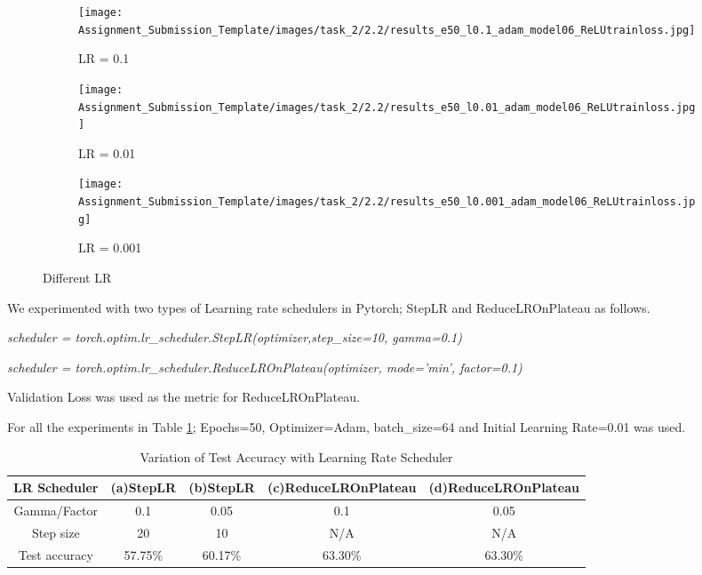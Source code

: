 \documentclass{article} %
\begin{document}
\begin{figure}[h!]
	\centering
	\begin{subfigure}{0.32\linewidth}
		\texttt{[image: Assignment\_Submission\_Template/images/task\_2/2.2/results\_e50\_l0.1\_adam\_model06\_ReLUtrainloss.jpg]}
		\caption{LR = 0.1}
		\label{fig:LR0.1}
	\end{subfigure}	
        \begin{subfigure}{0.32\linewidth}
		\texttt{[image: Assignment\_Submission\_Template/images/task\_2/2.2/results\_e50\_l0.01\_adam\_model06\_ReLUtrainloss.jpg]}
		\caption{LR = 0.01}
		\label{fig:LR0.01}
	\end{subfigure}	
	\begin{subfigure}{0.32\linewidth}
	        \texttt{[image: Assignment\_Submission\_Template/images/task\_2/2.2/results\_e50\_l0.001\_adam\_model06\_ReLUtrainloss.jpg]}
	        \caption{LR = 0.001}
	        \label{fig:LR0.001}
         \end{subfigure}
	\caption{Different LR}
	\label{fig:subfigures}
\end{figure}



We experimented with two types of Learning rate schedulers in Pytorch; StepLR and ReduceLROnPlateau as follows.

\textit{scheduler = torch.optim.lr\_scheduler.StepLR(optimizer,step\_size=10, gamma=0.1)} 

\textit{scheduler = torch.optim.lr\_scheduler.ReduceLROnPlateau(optimizer, mode='min', factor=0.1)} 

Validation Loss was used as the metric for ReduceLROnPlateau.

For all the experiments in Table \ref{table:4}; Epochs=50, Optimizer=Adam, batch\_size=64 and Initial Learning Rate=0.01 was used.

\begin{table}[h!]
\centering
\begin{tabular}{ | c | c | c | c | c | }
\hline
 LR Scheduler & (a)StepLR & (b)StepLR & (c)ReduceLROnPlateau & (d)ReduceLROnPlateau\\
 \hline
 Gamma/Factor & 0.1 & 0.05 & 0.1 & 0.05\\
 \hline
 Step size & 20 & 10 & N/A & N/A\\
 \hline
 Test accuracy & 57.75\% & 60.17\% & 63.30\% & 63.30\%\\
 \hline
\end{tabular}
\caption{Variation of Test Accuracy with Learning Rate Scheduler}
\label{table:4}
\end{table}
\end{document}
